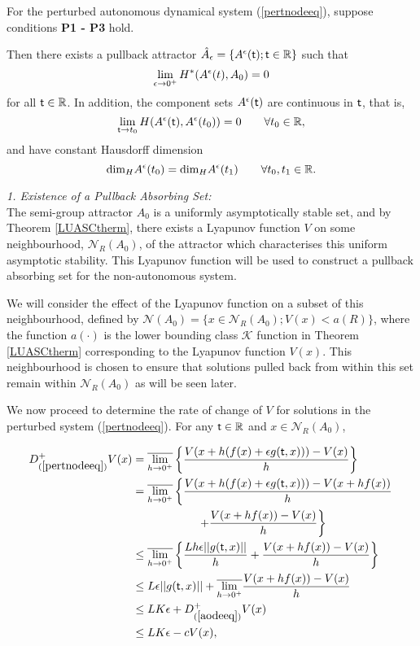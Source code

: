 \begin{therm}\label{npertthm}
For the perturbed autonomous dynamical system (\ref{pertnodeeq}), suppose
conditions \textbf{P1 - P3} hold.

Then there exists a pullback attractor $\hat{A}_{\epsilon} = \{
A^{\epsilon}( \mathsf{\mathsf{t}}) ;  \mathsf{\mathsf{t}} \in \mathbb{R} \}$ such that
\[ \lim_{\epsilon \to 0^+} H^*(A^{\epsilon}(t), A_0) = 0 \]
for all $ \mathsf{\mathsf{t}} \in \mathbb{R}$. In addition, the component sets
$A^{\epsilon}( \mathsf{\mathsf{t}})$ are continuous in $ \mathsf{\mathsf{t}}$, that is,
\[ \lim_{ \mathsf{\mathsf{t}} \to t_0} H(A^{\epsilon}( \mathsf{\mathsf{t}}),A^{\epsilon}(t_0)) = 0 \qquad
        \forall t_0 \in \mathbb{R}, \]
and have constant Hausdorff dimension
\[ \text{dim}_{H} A^{\epsilon}(t_0) = \text{dim}_{H} A^{\epsilon}(t_1)
                \qquad \forall t_0,t_1 \in \mathbb{R}. \]
\end{therm}
\begin{prf}
{\em 1. Existence of a Pullback Absorbing Set:} \hfill \\ 
The semi-group attractor
$A_0$ is a uniformly asymptotically stable set, and by Theorem
\ref{LUASCtherm}, there exists a Lyapunov function $V$ on some
neighbourhood, $\mathcal{N}_R(A_0)$, of the attractor which characterises
this uniform asymptotic stability. This Lyapunov function will be used to
construct a pullback absorbing set for the non-autonomous system.

We will consider the effect of the Lyapunov function on a subset of this
neighbourhood, defined by $\mathcal{N}(A_0) = \{ x \in \mathcal{N}_R(A_0);
V(x) < a(R) \}$, where the function $a(\cdot)$ is the lower bounding
class $\mathcal{K}$ function in Theorem \ref{LUASCtherm} corresponding to
the Lyapunov function $V(x)$. This neighbourhood is chosen to ensure that
solutions pulled back from within this set remain within
$\mathcal{N}_R(A_0)$ as will be seen later.

We now proceed to determine the rate of change of $V$ for solutions in the perturbed system (\ref{pertnodeeq}). For any $ \mathsf{\mathsf{t}} \in \mathbb{R}$ and $x \in \mathcal{N}_R(A_0)$,

\begin{align}\label{lineq}
 D^{+}_{(\ref{pertnodeeq})}V(x) &= \overline{\lim_{h \to 0^+}} \left\{
        \frac{V(x+h(f(x) + \epsilon g( \mathsf{\mathsf{t}},x))) - V(x)}{h} \right\}
        \nonumber \\
 &= \overline{\lim_{h \to 0^+}} \left\{\frac{V(x+h(f(x) + \epsilon g( \mathsf{\mathsf{t}},x)))
        - V(x + hf(x))}{h} \right. \nonumber \\
 & \hspace{2cm} \left. + \frac{V(x + hf(x)) - V(x)}{h} \right\} \nonumber \\
 & \leq \overline{\lim_{h \to 0^+}} \left\{\frac{Lh\epsilon ||g( \mathsf{\mathsf{t}},x)||}{h}
        + \frac{V(x + hf(x)) - V(x)}{h} \right\} \nonumber  \\
 & \leq L \epsilon ||g( \mathsf{\mathsf{t}},x)|| + \overline{\lim_{h \to 0^+}} \frac{V(x +
        hf(x)) - V(x)}{h} \nonumber \\
 & \leq L K \epsilon + D^{+}_{(\ref{aodeeq})}V(x) \nonumber  \\
 & \leq L K \epsilon - c V(x), \nonumber \\
\end{align}


\end{prf}

